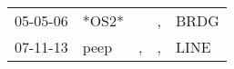\begin{supertabular}{p{0.07\textwidth}p{0.06\textwidth}p{0.02\textwidth}p{0.02\textwidth}p{0.06\textwidth}}
 05-05-06\textsuperscript{} &                   *OS2* &    &  , &  BRDG\textsuperscript{} \\
 07-11-13\textsuperscript{} &  peep\textsuperscript{} &  , &  , &  LINE\textsuperscript{} \\
\end{supertabular}
